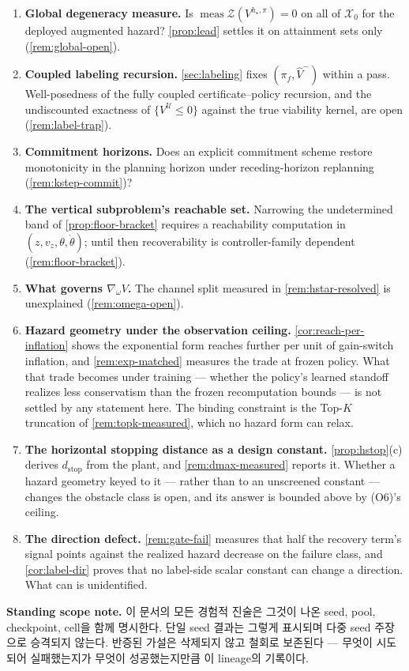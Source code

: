 \documentclass[11pt]{article}
\theoremstyle{plain}
\theoremstyle{definition}
\theoremstyle{remark}
\newcommand{\calX}{\mathcal{X}}
\newcommand{\calU}{\mathcal{U}}
\newcommand{\Vhat}{\widehat V}
\newcommand{\grad}{\nabla}
\begin{document}
\begin{enumerate}[label=(O\arabic*),leftmargin=2.6em]
  \item \textbf{Global degeneracy measure.} Is $\operatorname{meas}\mathcal Z(V^{h_\star,\pi})=0$
  on all of $\calX_0$ for the deployed augmented hazard? \cref{prop:lead} settles it on
  attainment sets only (\cref{rem:global-open}).
  \item \textbf{Coupled labeling recursion.} \cref{sec:labeling} fixes $(\pi_f,\Vhat^-)$ within
  a pass. Well-posedness of the fully coupled certificate--policy recursion, and the undiscounted
  exactness of $\{V^{\calU}\le0\}$ against the true viability kernel, are open
  (\cref{rem:label-trap}).
  \item \textbf{Commitment horizons.} Does an explicit commitment scheme restore monotonicity in
  the planning horizon under receding-horizon replanning (\cref{rem:kstep-commit})?
  \item \textbf{The vertical subproblem's reachable set.} Narrowing the undetermined band of
  \cref{prop:floor-bracket} requires a reachability computation in
  $(z,v_z,\theta,\dot\theta)$; until then recoverability is controller-family dependent
  (\cref{rem:floor-bracket}).
  \item \textbf{What governs $\grad_\omega V$.} The channel split measured in
  \cref{rem:hstar-resolved} is unexplained (\cref{rem:omega-open}).
  \item \textbf{Hazard geometry under the observation ceiling.} \cref{cor:reach-per-inflation}
  shows the exponential form reaches further per unit of gain-switch inflation, and
  \cref{rem:exp-matched} measures the trade at frozen policy. What that trade becomes under
  training --- whether the policy's learned standoff realizes less conservatism than the frozen
  recomputation bounds --- is not settled by any statement here. The binding constraint is the
  Top-$K$ truncation of \cref{rem:topk-measured}, which no hazard form can relax.
  \item \textbf{The horizontal stopping distance as a design constant.}
  \cref{prop:hstop}(c) derives $d_{\mathrm{stop}}$ from the plant, and \cref{rem:dmax-measured}
  reports it. Whether a hazard geometry keyed to it --- rather than to an unscreened constant ---
  changes the obstacle class is open, and its answer is bounded above by (O6)'s ceiling.
  \item \textbf{The direction defect.} \cref{rem:gate-fail} measures that half the recovery
  term's signal points against the realized hazard decrease on the failure class, and
  \cref{cor:label-dir} proves that no label-side scalar constant can change a direction. What
  can is unidentified.
\end{enumerate}

\bigskip
\noindent\textbf{Standing scope note.} 이 문서의 모든 경험적 진술은 그것이 나온 seed, pool,
checkpoint, cell을 함께 명시한다. 단일 seed 결과는 그렇게 표시되며 다중 seed 주장으로 승격되지
않는다. 반증된 가설은 삭제되지 않고 철회로 보존된다 --- 무엇이 시도되어 실패했는지가 무엇이
성공했는지만큼 이 lineage의 기록이다.
\end{document}
